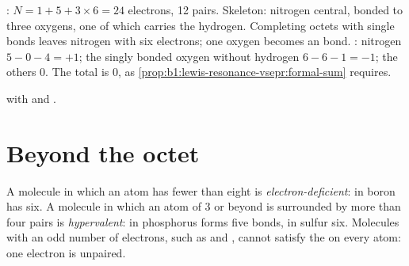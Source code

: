 \begin{example}\label{ex:b1:lewis-resonance-vsepr:hno3}
: $N = 1 + 5 + 3 \times 6 = 24$ electrons, 12 pairs. Skeleton:
nitrogen central, bonded to three oxygens, one of which carries the
hydrogen. Completing octets with single bonds leaves nitrogen with six
electrons; one oxygen  becomes an  bond. :
nitrogen $5 - 0 - 4 = +1$; the singly bonded oxygen without hydrogen
$6 - 6 - 1 = -1$; the others 0. The total is 0, as
\cref{prop:b1:lewis-resonance-vsepr:formal-sum} requires.
\end{example}

\begin{omfigure}

{\small {} with  and .}
\end{omfigure}

\section{Beyond the octet}

\begin{definition}\label{def:b1:lewis-resonance-vsepr:hypervalent}
A molecule in which an atom has fewer than eight  is
\emph{electron-deficient}: in  boron
has six. A molecule in which an atom of  3 or beyond is surrounded
by more than four pairs is \emph{hypervalent}: in
 phosphorus forms five bonds, in  sulfur six. Molecules
with an odd number of electrons, such as  and , cannot
satisfy the  on every atom: one electron is unpaired.
\end{definition}

